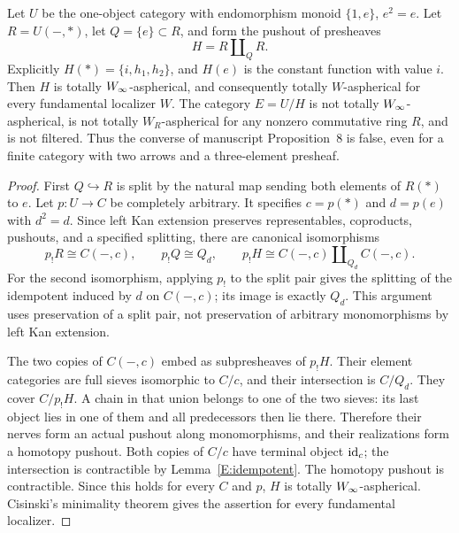 \begin{theorem}\label{E:counterexample}
Let $U$ be the one-object category with endomorphism monoid $\{1,e\}$, $e^2=e$. Let $R=U(-,*)$, let $Q=\{e\}\subset R$, and form the pushout of presheaves
\[
 H=R\amalg_QR.
\]
Explicitly $H(*)=\{i,h_1,h_2\}$, and $H(e)$ is the constant function with value $i$. Then $H$ is totally $W_{\infty}$-aspherical, and consequently totally $W$-aspherical for every fundamental localizer $W$. The category $E=U/H$ is not totally $W_{\infty}$-aspherical, is not totally $W_R$-aspherical for any nonzero commutative ring $R$, and is not filtered. Thus the converse of manuscript Proposition~8 is false, even for a finite category with two arrows and a three-element presheaf.
\end{theorem}
\begin{proof}
First $Q\hookrightarrow R$ is split by the natural map sending both elements of $R(*)$ to $e$. Let $p:U\to C$ be completely arbitrary. It specifies $c=p(*)$ and $d=p(e)$ with $d^2=d$. Since left Kan extension preserves representables, coproducts, pushouts, and a specified splitting, there are canonical isomorphisms
\[
 p_!R\cong C(-,c),\qquad
 p_!Q\cong Q_d,\qquad
 p_!H\cong C(-,c)\amalg_{Q_d}C(-,c).
\]
For the second isomorphism, applying $p_!$ to the split pair gives the splitting of the idempotent induced by $d$ on $C(-,c)$; its image is exactly $Q_d$. This argument uses preservation of a split pair, not preservation of arbitrary monomorphisms by left Kan extension.

The two copies of $C(-,c)$ embed as subpresheaves of $p_!H$. Their element categories are full sieves isomorphic to $C/c$, and their intersection is $C/Q_d$. They cover $C/p_!H$. A chain in that union belongs to one of the two sieves: its last object lies in one of them and all predecessors then lie there. Therefore their nerves form an actual pushout along monomorphisms, and their realizations form a homotopy pushout. Both copies of $C/c$ have terminal object $\mathrm{id}_c$; the intersection is contractible by Lemma~\ref{E:idempotent}. The homotopy pushout is contractible. Since this holds for every $C$ and $p$, $H$ is totally $W_{\infty}$-aspherical. Cisinski's minimality theorem gives the assertion for every fundamental localizer.


\end{proof}
